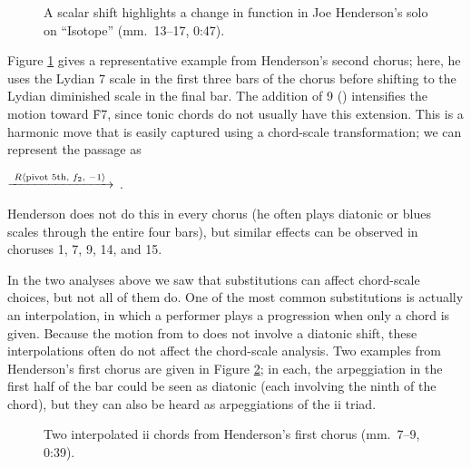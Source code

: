 \begin{figure}[tbp]
  \caption[A scalar shift highlights a change in function in Joe Henderson's
    solo on ``Isotope.'']{A scalar shift highlights a change in function in Joe
    Henderson's solo on ``Isotope'' (mm.~13--17, 0:47).}
  \label{csa:henderson-scale-shift}
\end{figure}

Figure \ref{csa:henderson-scale-shift} gives a representative example from
Henderson's second chorus; here, he uses the Lydian \flat{}7 scale in the first
three bars of the chorus before shifting to the Lydian diminished scale in the
final bar. The addition of \flat{}9 (\Dflat) intensifies the motion toward
\h{F7}, since tonic chords do not usually have this extension. This is a
harmonic move that is easily captured using a chord-scale transformation; we
can represent the passage as \\
{\centering
   $\xrightarrow{\text{ \mbox{\ensuremath{R\langle}pivot 5th, $f_2$, $-1$\ensuremath{\rangle}} }}$
  . \par}
\noindent Henderson does not do this in every chorus (he
often plays diatonic or blues scales through the entire four bars), but
similar effects can be observed in choruses 1, 7, 9, 14, and 15.

In the two analyses above we saw that substitutions can affect chord-scale
choices, but not all of them do. One of the most common substitutions is
actually an interpolation, in which a performer plays a \tf progression when
only a \V chord is given. Because the motion from \ii to \V does not involve a
diatonic shift, these interpolations often do not affect the chord-scale
analysis. Two examples from Henderson's first chorus are given in
Figure \ref{csa:ii7-interpolation}; in each, the arpeggiation in the first
half of the bar could be seen as diatonic (each involving the ninth of the \V
chord), but they can also be heard as arpeggiations of the ii triad.

\begin{figure}[tbp]
  \caption[Two interpolated \ii chords from Henderson's first chorus.]{Two
    interpolated ii chords from Henderson's first chorus (mm.~7--9, 0:39).}
  \label{csa:ii7-interpolation}
\end{figure}

